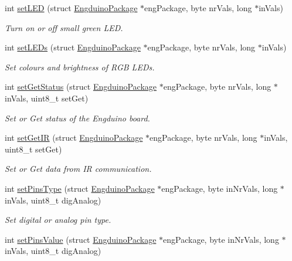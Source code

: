 \begin{DoxyCompactItemize}
int \hyperlink{group___engduino_protocol_ga4f6f6185d9345303466934fb97f5e5f3}{set\+L\+E\+D} (struct \hyperlink{struct_engduino_package}{Engduino\+Package} $\ast$eng\+Package, byte nr\+Vals, long $\ast$in\+Vals)
\begin{DoxyCompactList}\small\item\em Turn on or off small green L\+E\+D. \end{DoxyCompactList}\item 
int \hyperlink{group___engduino_protocol_ga429539daf1580716935d0f4c9fee60a7}{set\+L\+E\+Ds} (struct \hyperlink{struct_engduino_package}{Engduino\+Package} $\ast$eng\+Package, byte nr\+Vals, long $\ast$in\+Vals)
\begin{DoxyCompactList}\small\item\em Set colours and brightness of R\+G\+B L\+E\+Ds. \end{DoxyCompactList}\item 
int \hyperlink{group___engduino_protocol_gac1faeb0dc90fcacd10ee643c3a45f82f}{set\+Get\+Status} (struct \hyperlink{struct_engduino_package}{Engduino\+Package} $\ast$eng\+Package, byte nr\+Vals, long $\ast$in\+Vals, uint8\+\_\+t set\+Get)
\begin{DoxyCompactList}\small\item\em Set or Get status of the Engduino board. \end{DoxyCompactList}\item 
int \hyperlink{group___engduino_protocol_ga04358743c2b3e13ff61eb072d57e782a}{set\+Get\+I\+R} (struct \hyperlink{struct_engduino_package}{Engduino\+Package} $\ast$eng\+Package, byte nr\+Vals, long $\ast$in\+Vals, uint8\+\_\+t set\+Get)
\begin{DoxyCompactList}\small\item\em Set or Get data from I\+R communication. \end{DoxyCompactList}\item 
int \hyperlink{group___engduino_protocol_ga03a85a36fca38e5841424db6efd8cd17}{set\+Pins\+Type} (struct \hyperlink{struct_engduino_package}{Engduino\+Package} $\ast$eng\+Package, byte in\+Nr\+Vals, long $\ast$in\+Vals, uint8\+\_\+t dig\+Analog)
\begin{DoxyCompactList}\small\item\em Set digital or analog pin type. \end{DoxyCompactList}\item 
int \hyperlink{group___engduino_protocol_gad39688bc052b473389917ef7daa6f0f2}{set\+Pins\+Value} (struct \hyperlink{struct_engduino_package}{Engduino\+Package} $\ast$eng\+Package, byte in\+Nr\+Vals, long $\ast$in\+Vals, uint8\+\_\+t dig\+Analog)

\end{DoxyCompactItemize}
